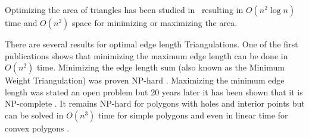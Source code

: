 Optimizing the area of triangles has been studied
in~\cite{triangulation_area} resulting in \(O(n^2 \log n)\) time
and \(O(n^2)\) space for minimizing or maximizing the area.

There are several results for optimal edge length Triangulations.
One of the first publications \cite{triangulation_minmax_length}
shows that minimizing the maximum edge length can be done in
\(O(n^2)\) time. Minimizing the edge length sum (also known as the 
Minimum Weight Triangulation) was proven NP-hard \cite{mwt_complexity}.
Maximizing the minimum edge length was stated an open problem
\cite{triangulation_minmax_length} but 20 years later it has been
shown that it is NP-complete \cite{mmlt_complexity}. It remains NP-hard
for polygons with holes and interior points \cite{mmlt_polygons}
but can be solved in \(O(n^3)\) time for simple
polygons and even in linear time for convex polygons
\cite{mmlt_convex_polygons}.

